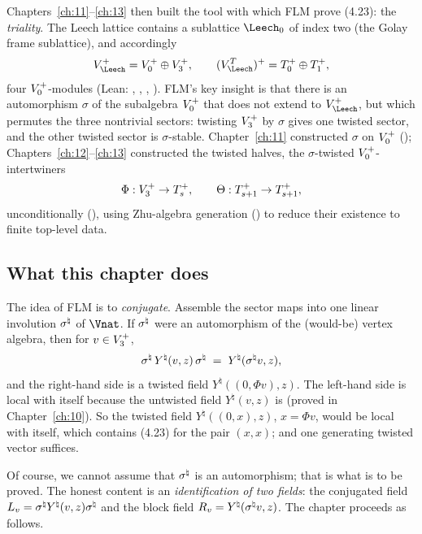 Chapters~\ref{ch:11}--\ref{ch:13} then built the tool with which FLM prove (4.23): the
\emph{triality}.  The Leech lattice contains a sublattice $\Leech_0$ of index two (the Golay frame
sublattice), and accordingly
\begin{equation*}
  V_\Leech^+ = \chXIVA\oplus\chXIVB,\qquad
  (V_\Leech^T)^+ = T_0^+\oplus T_1^+ ,
\end{equation*}
four $V_0^{+}$-modules (Lean: , , ,
).  FLM's key insight is that there is an automorphism $\sigma$ of the subalgebra
$V_0^{+}$ that does not extend to $V_\Leech^+$, but which permutes the three nontrivial sectors:
twisting $V_3^{+}$ by $\sigma$ gives one twisted sector, and the other twisted sector is
$\sigma$-stable.  Chapter~\ref{ch:11} constructed $\sigma$ on $V_0^{+}$ ();
Chapters~\ref{ch:12}--\ref{ch:13} constructed the twisted halves, the $\sigma$-twisted
$V_0^{+}$-intertwiners
\begin{equation*}
  \Phi:V_3^{+}\to T_s^+,\qquad \Theta:T_{s+1}^+\to T_{s+1}^+,
\end{equation*}
unconditionally (), using Zhu-algebra generation
() to reduce their existence to finite top-level data.

\subsection{What this chapter does}

The idea of FLM is to \emph{conjugate}.  Assemble the sector maps into one linear involution
$\sigma^{\natural}$ of $\Vnat$.  If $\sigma^{\natural}$ were an automorphism of the (would-be) vertex algebra,
then for $v\in V_3^{+}$,
\begin{equation*}
  \sigma^{\natural}\,Y^\natural(v,z)\,\sigma^{\natural} \;=\; Y^\natural(\sigma^{\natural} v,z),
\end{equation*}
and the right-hand side is a twisted field $Y^\natural((0,\Phi v),z)$.  The left-hand side is local
with itself because the untwisted field $Y^\natural(v,z)$ is (proved in Chapter~\ref{ch:10}).  So
the twisted field $Y^\natural((0,x),z)$, $x=\Phi v$, would be local with itself, which contains
(4.23) for the pair $(x,x)$; and one generating twisted vector suffices.

Of course, we cannot assume that $\sigma^{\natural}$ is an automorphism; that is what is to be proved.
The honest content is an \emph{identification of two fields}: the conjugated field
$L_v=\sigma^{\natural} Y^\natural(v,z)\sigma^{\natural}$ and the block field $R_v=Y^\natural(\sigma^{\natural} v,z)$.
The chapter proceeds as follows.

